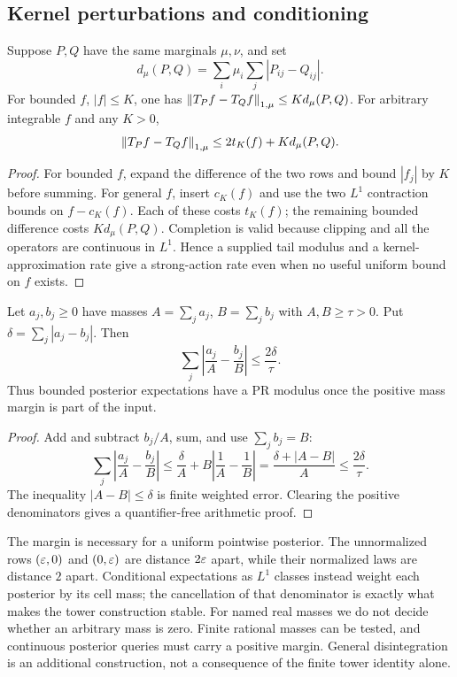 \subsection{Kernel perturbations and conditioning}

\begin{proposition}\label{prop:kernel-tail}
Suppose $P,Q$ have the same marginals $\mu,\nu$, and set
\[
 d_\mu(P,Q)=\sum_i\mu_i\sum_j|P_{ij}-Q_{ij}|.
\]
For bounded $f$, $|f|\le K$, one has
$\left\lVert T_Pf-T_Qf\right\rVert_{1,\mu}\le Kd_\mu(P,Q)$.
For arbitrary integrable $f$ and any $K>0$,
\begin{equation}\label{eq:kernel-tail}
 \left\lVert T_Pf-T_Qf\right\rVert_{1,\mu}
 \le2t_K(f)+Kd_\mu(P,Q).
\end{equation}
\end{proposition}
\begin{proof}
For bounded $f$, expand the difference of the two rows and bound
$|f_j|$ by $K$ before summing. For general $f$, insert $c_K(f)$ and use
the two $L^1$ contraction bounds on $f-c_K(f)$. Each of these costs
$t_K(f)$; the remaining bounded difference costs $Kd_\mu(P,Q)$.
Completion is valid because clipping and all the operators are continuous
in $L^1$. Hence a supplied tail modulus and a kernel-approximation rate
give a strong-action rate even when no useful uniform bound on $f$ exists.
\end{proof}

\begin{proposition}\label{prop:bayes}
Let $a_j,b_j\ge0$ have masses $A=\sum_ja_j$, $B=\sum_jb_j$ with
$A,B\ge\tau>0$. Put $\delta=\sum_j|a_j-b_j|$. Then
\begin{equation}\label{eq:bayes}
 \sum_j\left|\frac{a_j}{A}-\frac{b_j}{B}\right|
 \le\frac{2\delta}{\tau}.
\end{equation}
Thus bounded posterior expectations have a PR modulus once the positive
mass margin is part of the input.
\end{proposition}
\begin{proof}
Add and subtract $b_j/A$, sum, and use $\sum_jb_j=B$:
\[
 \sum_j\left|\frac{a_j}{A}-\frac{b_j}{B}\right|
 \le\frac{\delta}{A}+B\left|\frac1A-\frac1B\right|
 =\frac{\delta+|A-B|}{A}\le\frac{2\delta}{\tau}.
\]
The inequality $|A-B|\le\delta$ is finite weighted error. Clearing the
positive denominators gives a quantifier-free arithmetic proof.
\end{proof}

The margin is necessary for a uniform pointwise posterior. The unnormalized
rows $(\varepsilon,0)$ and $(0,\varepsilon)$ are distance $2\varepsilon$ apart, while their
normalized laws are distance $2$ apart. Conditional expectations as $L^1$
classes instead weight each posterior by its cell mass; the cancellation
of that denominator is exactly what makes the tower construction stable.
For named real masses we do not decide whether an arbitrary mass is zero.
Finite rational masses can be tested, and continuous posterior queries
must carry a positive margin. General disintegration is an additional
construction, not a consequence of the finite tower identity alone.
